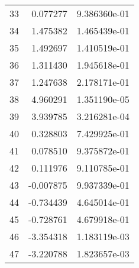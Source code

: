 \begin{tabular}{lrr}
33 &   0.077277 &  9.386360e-01 \\
34 &   1.475382 &  1.465439e-01 \\
35 &   1.492697 &  1.410519e-01 \\
36 &   1.311430 &  1.945618e-01 \\
37 &   1.247638 &  2.178171e-01 \\
38 &   4.960291 &  1.351190e-05 \\
39 &   3.939785 &  3.216281e-04 \\
40 &   0.328803 &  7.429925e-01 \\
41 &   0.078510 &  9.375872e-01 \\
42 &   0.111976 &  9.110785e-01 \\
43 &  -0.007875 &  9.937339e-01 \\
44 &  -0.734439 &  4.645014e-01 \\
45 &  -0.728761 &  4.679918e-01 \\
46 &  -3.354318 &  1.183119e-03 \\
47 &  -3.220788 &  1.823657e-03 \\
\bottomrule
\end{tabular}
